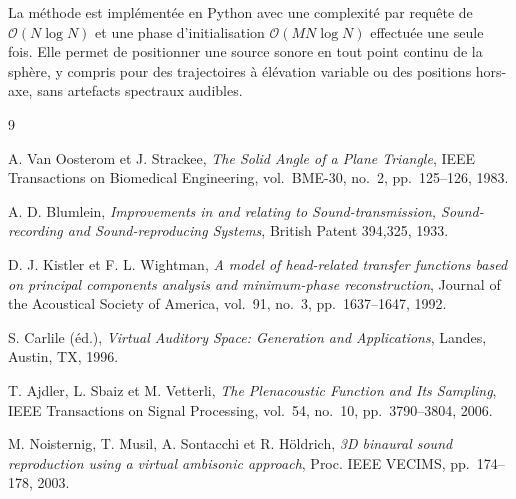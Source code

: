 \documentclass[12pt, a4paper]{article}
\theoremstyle{definition}
\begin{document}
La méthode est implémentée en Python avec une complexité par requête de
$\mathcal{O}(N\log N)$ et une phase d'initialisation $\mathcal{O}(MN\log N)$
effectuée une seule fois. Elle permet de positionner une source sonore en tout
point continu de la sphère, y compris pour des trajectoires à élévation variable
ou des positions hors-axe, sans artefacts spectraux audibles.

\begin{thebibliography}{9}

A. Van Oosterom et J. Strackee,
\textit{The Solid Angle of a Plane Triangle},
IEEE Transactions on Biomedical Engineering,
vol.~BME-30, no.~2, pp.~125--126, 1983.

A. D. Blumlein,
\textit{Improvements in and relating to Sound-transmission, Sound-recording and Sound-reproducing Systems},
British Patent 394,325, 1933.

D. J. Kistler et F. L. Wightman,
\textit{A model of head-related transfer functions based on principal components analysis and minimum-phase reconstruction},
Journal of the Acoustical Society of America,
vol.~91, no.~3, pp.~1637--1647, 1992.

S. Carlile (éd.),
\textit{Virtual Auditory Space: Generation and Applications},
Landes, Austin, TX, 1996.

T. Ajdler, L. Sbaiz et M. Vetterli,
\textit{The Plenacoustic Function and Its Sampling},
IEEE Transactions on Signal Processing,
vol.~54, no.~10, pp.~3790--3804, 2006.

M. Noisternig, T. Musil, A. Sontacchi et R. Höldrich,
\textit{3D binaural sound reproduction using a virtual ambisonic approach},
Proc. IEEE VECIMS, pp.~174--178, 2003.

\end{thebibliography}
\end{document}
